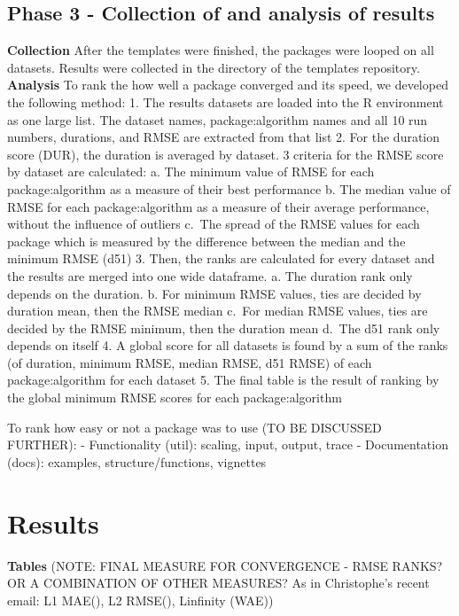 \hypertarget{phase-3---collection-of-and-analysis-of-results}{%
\subsection{Phase 3 - Collection of and analysis of
results}\label{phase-3---collection-of-and-analysis-of-results}}

\textbf{Collection} After the templates were finished, the packages were
looped on all datasets. Results were collected in the directory of the
templates repository. \textbf{Analysis} To rank the how well a package
converged and its speed, we developed the following method: 1. The
results datasets are loaded into the R environment as one large list.
The dataset names, package:algorithm names and all 10 run numbers,
durations, and RMSE are extracted from that list 2. For the duration
score (DUR), the duration is averaged by dataset. 3 criteria for the
RMSE score by dataset are calculated: a. The minimum value of RMSE for
each package:algorithm as a measure of their best performance b. The
median value of RMSE for each package:algorithm as a measure of their
average performance, without the influence of outliers c.~The spread of
the RMSE values for each package which is measured by the difference
between the median and the minimum RMSE (d51) 3. Then, the ranks are
calculated for every dataset and the results are merged into one wide
dataframe. a. The duration rank only depends on the duration. b. For
minimum RMSE values, ties are decided by duration mean, then the RMSE
median c.~For median RMSE values, ties are decided by the RMSE minimum,
then the duration mean d.~The d51 rank only depends on itself 4. A
global score for all datasets is found by a sum of the ranks (of
duration, minimum RMSE, median RMSE, d51 RMSE) of each package:algorithm
for each dataset 5. The final table is the result of ranking by the
global minimum RMSE scores for each package:algorithm

To rank how easy or not a package was to use (TO BE DISCUSSED FURTHER):
- Functionality (util): scaling, input, output, trace - Documentation
(docs): examples, structure/functions, vignettes

\hypertarget{results}{%
\section{Results}\label{results}}

\textbf{Tables} (NOTE: FINAL MEASURE FOR CONVERGENCE - RMSE RANKS? OR A
COMBINATION OF OTHER MEASURES? As in Christophe's recent email: L1
MAE(), L2 RMSE(), Linfinity (WAE))

